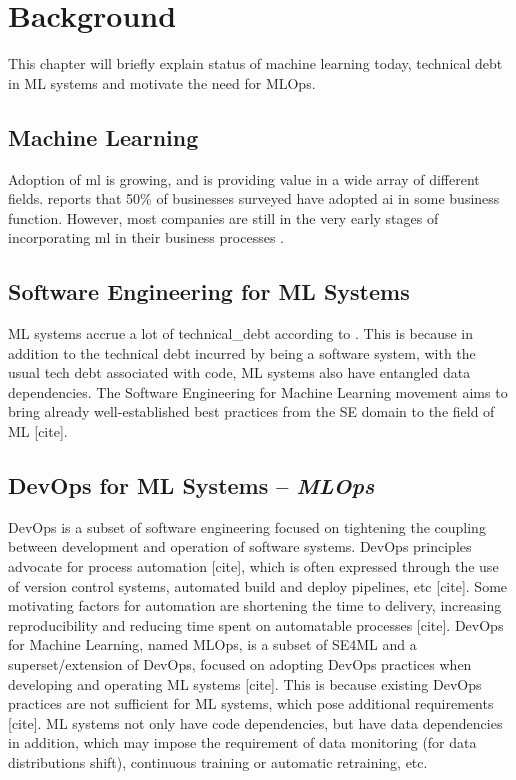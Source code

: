 \chapter{Background}
\label{ch:background}
This chapter will briefly explain status of machine learning today, technical debt in ML systems and motivate the need for MLOps.

\section{Machine Learning}
Adoption of \acrshort{ml} is growing, and is providing value in a wide array of different fields.
\textcite{mckinsey2020} reports that 50\% of businesses surveyed have adopted \acrshort{ai} in some business function.
However, most companies are still in the very early stages of incorporating \acrshort{ml} in their business processes \cite{Schloegl2019}.

\section{Software Engineering for ML Systems}
ML systems accrue a lot of \gls{technical_debt} according to \textcite{Sculley2015}.
This is because in addition to the technical debt incurred by being a software system, with the usual tech debt associated with code, ML systems also have entangled data dependencies.
The Software Engineering for Machine Learning movement aims to bring already well-established best practices from the SE domain to the field of ML [cite].

\section{DevOps for ML Systems -- \emph{MLOps}}
DevOps is a subset of software engineering focused on tightening the coupling between development and operation of software systems.
DevOps principles advocate for process automation [cite], which is often expressed through the use of version control systems, automated build and deploy pipelines, etc [cite].
Some motivating factors for automation are shortening the time to delivery, increasing reproducibility and reducing time spent on automatable processes [cite].
DevOps for Machine Learning, named MLOps, is a subset of SE4ML and a superset/extension of DevOps, focused on adopting DevOps practices when developing and operating ML systems [cite].
This is because existing DevOps practices are not sufficient for ML systems, which pose additional requirements [cite].
ML systems not only have code dependencies, but have data dependencies in addition, which may impose the requirement of data monitoring (for data distributions shift), continuous training or automatic retraining, etc.

